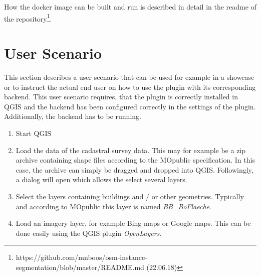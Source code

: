 How the docker image can be built and run is described in detail in the readme of the repository\footnote{https://github.com/mnboos/osm-instance-segmentation/blob/master/README.md (22.06.18)}.

\section{User Scenario}
This section describes a user scenario that can be used for example in a showcase or to instruct the actual end user on how to use the plugin with its corresponding backend. This user scenario requires, that the plugin is correctly installed in QGIS and the backend has been configured correctly in the settings of the plugin. Additionally, the backend has to be running.

\begin{enumerate}
    \item Start QGIS
    \item Load the data of the cadastral survey data. This may for example be a zip archive containing shape files according to the MOpublic \cite{mopublic}  specification. In this case, the archive can simply be dragged and dropped into QGIS. Followingly, a dialog will open which allows the select several layers. 
    \item Select the layers containing buildings and / or other geometries. Typically and according to MOpublic this layer is named \textit{BB\_BoFlaeche}.
    \item Load an imagery layer, for example Bing maps or Google maps. This can be done easily using the QGIS plugin \textit{OpenLayers}.
\end{enumerate}